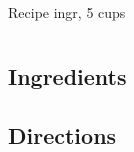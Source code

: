 Recipe
  ingr, 5 cups

\section{ }

\subsection{ Ingredients }

\begin{itemize}
\end{itemize}

\subsection{ Directions }

\begin{enumerate}
\end{enumerate}
